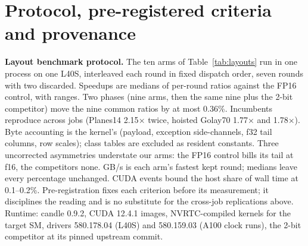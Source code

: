 \section{Protocol, pre-registered criteria and provenance}
\label{app:protocol}

\textbf{Layout benchmark protocol.} The ten arms of Table~\ref{tab:layouts}
run in one process on one L40S, interleaved each round in fixed dispatch
order, seven rounds with two discarded. Speedups are medians of per-round
ratios against the FP16 control, with ranges. Two phases (nine arms, then
the same nine plus the 2-bit competitor) move the nine common ratios by at
most 0.36\%. Incumbents reproduce across jobs (Planes14
2.15$\times$ twice, hoisted Golay70 1.77$\times$ and 1.78$\times$). Byte
accounting is the kernel's (payload, exception side-channels, f32 tail
columns, row scales); class tables are excluded as resident constants.
Three uncorrected asymmetries understate our arms: the FP16 control bills
its tail at f16, the competitors none. GB/s is each arm's fastest kept
round; medians leave every percentage unchanged. CUDA events bound the host
share of wall time at 0.1--0.2\%. Pre-registration fixes each criterion
before its measurement; it disciplines the reading and is no substitute for
the cross-job replications above. Runtime: candle 0.9.2, CUDA 12.4.1
images, NVRTC-compiled kernels for the target SM, drivers 580.178.04 (L40S)
and 580.159.03 (A100 clock runs), the 2-bit competitor at its pinned
upstream commit.

